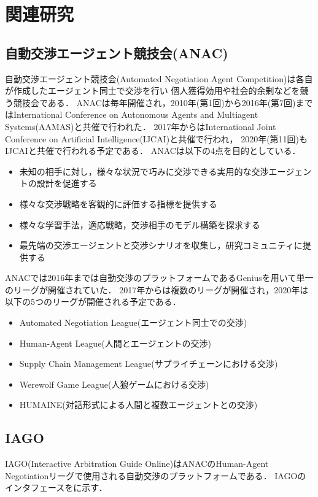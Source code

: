 

\chapter{関連研究}
\section{自動交渉エージェント競技会(ANAC)}

自動交渉エージェント競技会(Automated Negotiation Agent Competition)は各自が作成したエージェント同士で交渉を行い
個人獲得効用や社会的余剰などを競う競技会である\cite{anac2010-2017,anac2018,anac2019,anac2020}．
ANACは毎年開催され，2010年(第1回)から2016年(第7回)まではInternational Conference on Autonomous Agents and Multiagent Systems(AAMAS)と共催で行われた．
2017年からはInternational Joint Conference on Artificial Intelligence(IJCAI)と共催で行われ，
2020年(第11回)もIJCAIと共催で行われる予定である．
ANACは以下の4点を目的としている．

\begin{itemize}
    \item 未知の相手に対し，様々な状況で巧みに交渉できる実用的な交渉エージェントの設計を促進する
    \item 様々な交渉戦略を客観的に評価する指標を提供する
    \item 様々な学習手法，適応戦略，交渉相手のモデル構築を探求する
    \item 最先端の交渉エージェントと交渉シナリオを収集し，研究コミュニティに提供する
\end{itemize}

ANACでは2016年までは自動交渉のプラットフォームであるGeniusを用いて単一のリーグが開催されていた．
2017年からは複数のリーグが開催され，2020年は以下の5つのリーグが開催される予定である．

\begin{itemize}
    \item Automated Negotiation League(エージェント同士での交渉)
    \item Human-Agent League(人間とエージェントの交渉)
    \item Supply Chain Management League(サプライチェーンにおける交渉)
    \item Werewolf Game League(人狼ゲームにおける交渉)
    \item HUMAINE(対話形式による人間と複数エージェントとの交渉)
\end{itemize}

\section{IAGO}
IAGO(Interactive Arbitration Guide Online)はANACのHuman-Agent Negotiationリーグで使用される自動交渉のプラットフォームである\cite{iago}．
IAGOのインタフェースをに示す．

